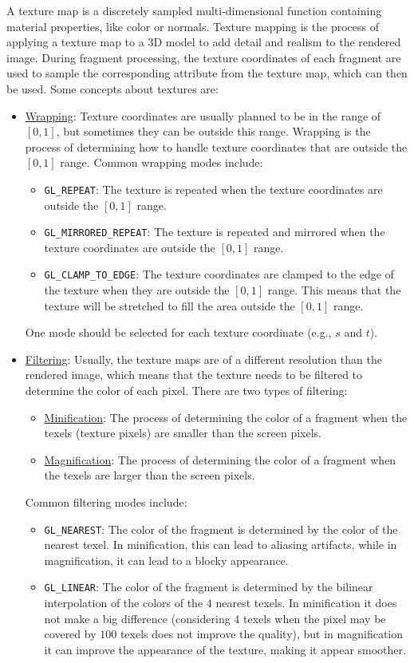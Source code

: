 A texture map is a discretely sampled multi-dimensional function containing material properties, like color or normals. Texture mapping is the process of applying a texture map to a 3D model to add detail and realism to the rendered image. During fragment processing, the texture coordinates of each fragment are used to sample the corresponding attribute from the texture map, which can then be used. Some concepts about textures are:
\begin{itemize}
    \item \ul{Wrapping}: Texture coordinates are usually planned to be in the range of $[0, 1]$, but sometimes they can be outside this range. Wrapping is the process of determining how to handle texture coordinates that are outside the $[0, 1]$ range. Common wrapping modes include:
    \begin{itemize}
        \item \texttt{GL\_REPEAT}: The texture is repeated when the texture coordinates are outside the $[0, 1]$ range.
        \item \texttt{GL\_MIRRORED\_REPEAT}: The texture is repeated and mirrored when the texture coordinates are outside the $[0, 1]$ range.
        \item \texttt{GL\_CLAMP\_TO\_EDGE}: The texture coordinates are clamped to the edge of the texture when they are outside the $[0, 1]$ range. This means that the texture will be stretched to fill the area outside the $[0, 1]$ range.
    \end{itemize}
    One mode should be selected for each texture coordinate (e.g., $s$ and $t$).
    \item \ul{Filtering}: Usually, the texture maps are of a different resolution than the rendered image, which means that the texture needs to be filtered to determine the color of each pixel. There are two types of filtering:
    \begin{itemize}
        \item \ul{Minification}: The process of determining the color of a fragment when the texels (texture pixels) are smaller than the screen pixels.
        \item \ul{Magnification}: The process of determining the color of a fragment when the texels are larger than the screen pixels.
    \end{itemize}

    Common filtering modes include:
    \begin{itemize}
        \item \texttt{GL\_NEAREST}: The color of the fragment is determined by the color of the nearest texel. In minification, this can lead to aliasing artifacts, while in magnification, it can lead to a blocky appearance.
        \item \texttt{GL\_LINEAR}: The color of the fragment is determined by the bilinear interpolation of the colors of the $4$ nearest texels. In minification it does not make a big difference (considering $4$ texels when the pixel may be covered by $100$ texels does not improve the quality), but in magnification it can improve the appearance of the texture, making it appear smoother.
    \end{itemize}


\end{itemize}
